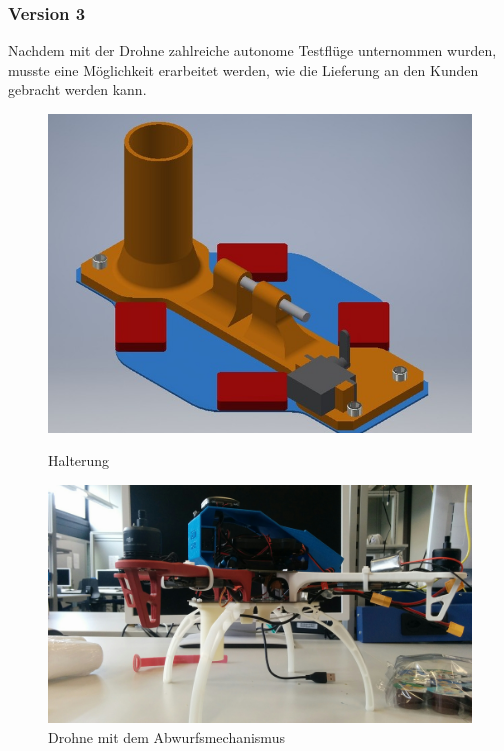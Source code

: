 \subsubsection{Version 3}
Nachdem mit der Drohne zahlreiche autonome Testflüge unternommen wurden, musste eine Möglichkeit erarbeitet werden, wie die Lieferung an den Kunden gebracht werden kann.

\begin{figure}[H]
	\centering
	\begin{minipage}[b]{0.4\textwidth}
		\includegraphics[width=\textwidth]{images/hardware/parachute-model.jpg}
		\caption{Halterung}
		\label{asdf}
	\end{minipage}
	\hfill
	\begin{minipage}[b]{0.4\textwidth}
		\includegraphics[width=\textwidth]{images/hardware/drone-with-servo.jpg}
		\caption{Drohne mit dem Abwurfsmechanismus}
		\label{asdf}
	\end{minipage}
\end{figure}


